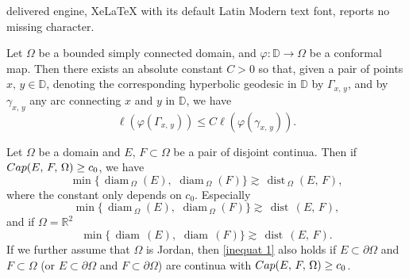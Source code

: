 \documentclass[10pt,a4paper]{amsart}
\def\diam{{\mathop\mathrm{\,diam\,}}}
\def\dist{{\mathop\mathrm{\,dist\,}}}
\begin{document}
delivered engine, XeLaTeX with its default Latin Modern text font, reports no missing character.
\begin{thm}\label{GM bdd}
Let $\Omega$ be a bounded simply connected domain, and $\varphi\colon \mathbb D \to \Omega$ be a conformal map. Then there exists an absolute constant $C>0$ so that,  given a pair of points
$x,\,y\in \mathbb D$, 
denoting the corresponding hyperbolic geodesic in 
$\mathbb D$ by $\Gamma_{x,\,y}$, 
and by $\gamma_{x,\,y}$ any 
arc connecting $x$ and $y$ in $ \mathbb D$, we have
$$\ell(\varphi(\Gamma_{x,\,y}))\le C \ell(\varphi(\gamma_{x,\,y})). $$
\end{thm}

\begin{lem}{\label{inner capacity}}
Let $\Omega$ be a domain and  $E,\,F\subset \Omega$ be a pair of disjoint continua. 
Then if ${\rm Cap}(E,\,F,\, \Omega)\ge c_0$, we have
\begin{equation}\label{inequat 1}
{\min\{\diam_{\Omega}(E),\,\diam_{\Omega}(F)\}}\gtrsim {\dist_{\Omega}(E,\,F)},
\end{equation}
where the constant only depends on $c_0$. Especially
$${\min\{\diam_{\Omega}(E),\,\diam_{\Omega}(F)\}}\gtrsim {\dist (E,\,F)}, $$
and if $\Omega=\mathbb R^2$
\begin{equation}\label{inequat 10}
\min\{\diam(E),\,\diam(F)\}\gtrsim {\dist (E,\,F)}.  
\end{equation}
If we further assume that $\Omega$ is Jordan, then \eqref{inequat 1} also holds if $E\subset \partial\Omega$ and $F\subset\Omega$ (or $E\subset \partial\Omega$ and $F\subset\partial\Omega$) are continua with ${\rm Cap}(E,\,F,\, \Omega)\ge c_0$. 
\end{lem}
\end{document}
